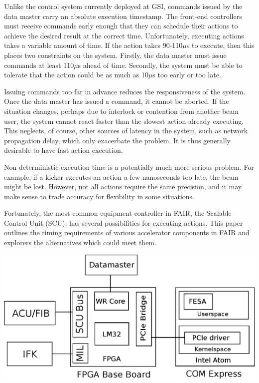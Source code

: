 \documentclass[25pt,halfparskip-,pagesize]{scrartcl}
\begin{document}
\begin{multicols*}{3}
Unlike the control system currently deployed at GSI,
commands issued by the data master carry an absolute execution timestamp.
The front-end controllers must receive commands early enough
that they can schedule their actions
to achieve the desired result at the correct time.
Unfortunately, executing actions takes a variable amount of time.
If the action takes 90-110$\mu$s to execute,
then this places two constraints on the system.
Firstly, the data master must issue commands at least 110$\mu$s ahead of time.
Secondly, the system must be able to tolerate that the action could be as
much as 10$\mu$s too early or too late.

Issuing commands too far in advance reduces the responsiveness of the system.
Once the data master has issued a command, it cannot be aborted.
If the situation changes,
perhaps due to interlock or contention from another beam user,
the system cannot react faster than the slowest action already executing.
This neglects, of course, other sources of latency in the system,
such as network propagation delay, which only exacerbate the problem.
It is thus generally desirable to have fast action execution.

Non-deterministic execution time is a potentially much more serious problem.
For example, if a kicker executes an action a few nanoseconds too late,
the beam might be lost.
However, not all actions require the same precision,
and it may make sense to trade accuracy for flexibility in some situations.

Fortunately, the  most common equipment controller in FAIR,
the Scalable Control Unit (SCU),
has several possibilities for executing actions.
This paper outlines the timing requirements of various accelerator
components in FAIR and explorers the alternatives which could meet them.



\includegraphics[width=\columnwidth]{../images/WEPD48f2}


\end{multicols*}
\end{document}

